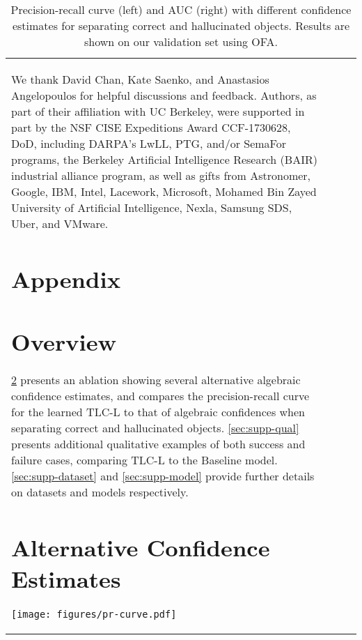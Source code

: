 \documentclass[10pt,twocolumn,letterpaper]{article}
\newcommand{\minisection}[1]{\noindent{\textbf{#1.}}}
\newcommand{\ApproachName}{TLC\xspace}
\newcommand{\OFALarge}{OFA\xspace}
\begin{document}
\begin{table}
{\begin{tabular}{l@{}ccc}
\minisection{Acknowledgements} We thank David Chan, Kate Saenko, and Anastasios Angelopoulos for helpful discussions and feedback.  Authors, as part of their affiliation with UC Berkeley, were supported in part by the NSF CISE Expeditions Award CCF-1730628, DoD, including DARPA’s LwLL, PTG, and/or SemaFor programs, the Berkeley Artificial Intelligence Research (BAIR) industrial alliance program, as well as gifts from Astronomer, Google, IBM, Intel, Lacework, Microsoft, Mohamed Bin Zayed University of Artificial Intelligence, Nexla, Samsung SDS, Uber, and VMware.

{\small


}

\clearpage

\appendix

\section*{Appendix}

\section{Overview}
\label{sec:supp-overview}

\cref{sec:supp-precision-recall} presents an ablation showing several alternative algebraic confidence estimates, and compares the precision-recall curve for the learned \ApproachName-L to that of algebraic confidences when separating correct and hallucinated objects.
\cref{sec:supp-qual} presents additional qualitative examples of both success and failure cases, comparing \ApproachName-L to the Baseline model. \cref{sec:supp-dataset} and \cref{sec:supp-model} provide further details on datasets and models respectively.


\section{Alternative Confidence Estimates}
\label{sec:supp-precision-recall}

\begin{figure*}[h]
  \centering
   \texttt{[image: figures/pr-curve.pdf]}
   \caption{Precision-recall curve (left) and AUC (right) with different confidence estimates for separating correct and hallucinated objects. Results are shown on our validation set using \OFALarge.
   }
   \label{fig:supp-pr}
\end{figure*} 


\end{tabular}}
\end{table}
\end{document}
